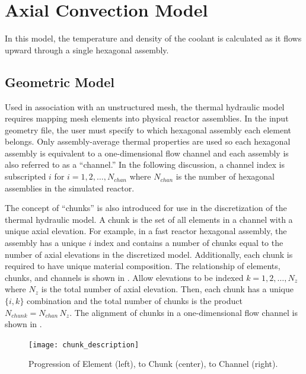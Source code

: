 \section{Axial Convection Model}
  \label{sec:axial_convection_model}
  In this model, the temperature and density of the coolant is calculated as
  it flows upward through a single hexagonal assembly.

  \subsection{Geometric Model}
    Used in association with an unstructured mesh, the thermal hydraulic model
    requires mapping mesh elements into physical reactor assemblies. In the 
    input geometry file, the user must specify to which hexagonal assembly each
    element belongs.
    Only assembly-average thermal properties are used so each hexagonal assembly
    is equivalent to a one-dimensional flow channel and each assembly is also
    referred to as a ``channel.''
    In the following discussion, a channel index is
    subscripted $i$ for $i = 1,2,\ldots,N_{chan}$ where $N_{chan}$ is the number
    of hexagonal assemblies in the simulated reactor. 

    The concept of ``chunks'' is also introduced for use in the discretization 
    of the thermal hydraulic model. A chunk is the set of all elements in a 
    channel with a unique axial elevation. For example, in a fast reactor 
    hexagonal assembly, the assembly has a unique $i$ index and contains a 
    number of chunks equal to the number of axial elevations in the discretized
    model. 
    Additionally, each chunk is required to have unique material composition. 
    The relationship of elements, chunks, and channels is shown in 
    . Allow elevations to be indexed $k =
    1,2,\ldots,N_z$ where $N_z$ is the total number of axial elevation. Then,
    each chunk has a unique $\{i,k\}$ combination and the total number of chunks
    is the product $N_{chunk} = N_{chan} \, N_z$.
    The alignment of chunks in a one-dimensional flow channel is shown in
    .

    \begin{figure}
      \centering
      \texttt{[image: chunk\_description]}
      \caption{Progression of Element (left), to Chunk (center), to Channel
        (right).}
      \label{fig:chunk_description}
    \end{figure}
    
